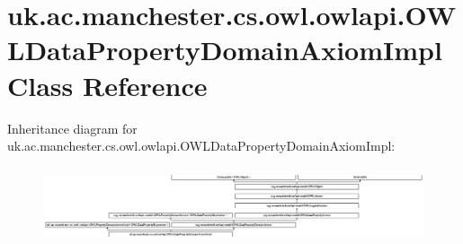 \hypertarget{classuk_1_1ac_1_1manchester_1_1cs_1_1owl_1_1owlapi_1_1_o_w_l_data_property_domain_axiom_impl}{\section{uk.\-ac.\-manchester.\-cs.\-owl.\-owlapi.\-O\-W\-L\-Data\-Property\-Domain\-Axiom\-Impl Class Reference}
\label{classuk_1_1ac_1_1manchester_1_1cs_1_1owl_1_1owlapi_1_1_o_w_l_data_property_domain_axiom_impl}
}
Inheritance diagram for uk.\-ac.\-manchester.\-cs.\-owl.\-owlapi.\-O\-W\-L\-Data\-Property\-Domain\-Axiom\-Impl\-:\begin{figure}[H]
\begin{center}
\leavevmode
\includegraphics[height=2.252874cm]{classuk_1_1ac_1_1manchester_1_1cs_1_1owl_1_1owlapi_1_1_o_w_l_data_property_domain_axiom_impl}
\end{center}
\end{figure}
